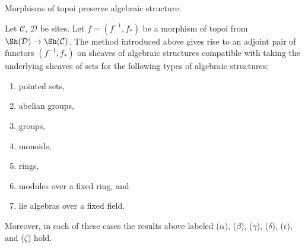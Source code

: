 \begin{proposition}
\label{proposition-functoriality-algebraic-structures-topoi}
\begin{slogan}
Morphisms of topoi preserve algebraic structure.
\end{slogan}
Let $\mathcal{C}$, $\mathcal{D}$ be sites.
Let $f = (f^{-1}, f_*)$ be a morphism of topoi
from $\Sh(\mathcal{D}) \to \Sh(\mathcal{C})$.
The method introduced above gives rise to an adjoint
pair of functors $(f^{-1}, f_*)$ on sheaves of algebraic structures
compatible with taking the underlying sheaves of sets
for the following types of algebraic structures:
\begin{enumerate}
\item pointed sets,
\item abelian groups,
\item groups,
\item monoids,
\item rings,
\item modules over a fixed ring, and
\item lie algebras over a fixed field.
\end{enumerate}
Moreover, in each of these cases the results above labeled ($\alpha$),
($\beta$), ($\gamma$), ($\delta$), ($\epsilon$), and ($\zeta$) hold.
\end{proposition}

